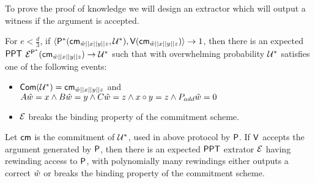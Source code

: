 To prove the proof of knowledge we will design an extractor which will output a witness if the argument is accepted.

\begin{theorem}
	For $e < \frac{d}{3}$, if $\langle \mathsf{P}^*(\mathsf{cm}_{\hat{w}||x||y||z}, \mathcal{U}^*),\mathsf{V}(\mathsf{cm}_{\hat{w}||x||y||z})\rangle \rightarrow 1$, then there is an expected $\mathsf{PPT}$ $\mathcal{E}^{\mathsf{P}^*}(\mathsf{cm}_{\hat{w}||x||y||z}) \rightarrow \mathcal{U}^*$ such that with overwhelming probability $\mathcal{U}^*$ satisfies one of the following events:
	\begin{itemize}
		\item $\mathsf{Com}(\mathcal{U}^*)=\mathsf{cm}_{\hat{w}||x||y||z}$ and $A\hat{w} = x \wedge B \hat{w} = y \wedge C \hat{w} = z \wedge x\circ y =z \wedge P_{add} \hat{w} = 0$
		\item $\mathcal{E}$ breaks the binding property of the commitment scheme.
		
	\end{itemize}
	Let $\mathsf{cm}$ is the commitment of $\mathcal{U}^*$, used in above protocol by $\mathsf{P}$. If $\mathsf{V}$ accepts the argument generated by $\mathsf{P}$, then there is an expected $\mathsf{PPT}$ extrator $\mathcal{E}$ having rewinding access to $\mathsf{P}$, with polynomially many rewindings either outputs a correct $\hat{w}$ or breaks the binding property of the commitment scheme.
\end{theorem}

